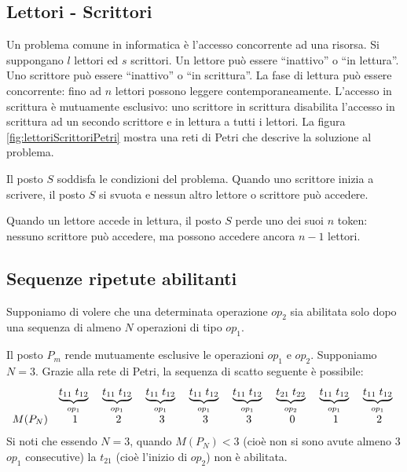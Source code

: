 \documentclass[a4paper]{report}
\begin{document}
\subsection{Lettori - Scrittori}
Un problema comune in informatica \`e l'accesso concorrente ad una
risorsa. Si suppongano $l$ lettori ed $s$ scrittori. Un lettore pu\`o
essere ``inattivo'' o ``in lettura''. Uno scrittore pu\`o essere
``inattivo'' o ``in scrittura''. La fase di lettura pu\`o essere
concorrente: fino ad $n$ lettori possono leggere
contemporaneamente. L'accesso in scrittura \`e mutuamente esclusivo:
uno scrittore in scrittura disabilita l'accesso in scrittura ad un
secondo scrittore e in lettura a tutti i lettori.
La figura \ref{fig:lettoriScrittoriPetri} mostra una reti di Petri che
descrive la soluzione al problema.

Il posto $S$ soddisfa le condizioni del problema. Quando uno scrittore
inizia a scrivere, il posto $S$ si svuota e nessun altro
lettore o scrittore pu\`o accedere.

Quando un lettore accede in lettura, il posto $S$ perde uno dei suoi
$n$ token: nessuno scrittore pu\`o accedere, ma possono accedere
ancora $n - 1$ lettori.

\subsection{Sequenze ripetute abilitanti}
Supponiamo di volere che una determinata operazione $op_2$ sia
abilitata solo dopo una sequenza di almeno $N$ operazioni di tipo
$op_1$.

Il posto $P_m$ rende mutuamente esclusive le operazioni $op_1$ e
$op_2$. Supponiamo $N = 3$. Grazie alla rete di Petri, la sequenza di
scatto seguente \`e possibile:
\[
\begin{array}{c c c c c c c c c}
  &
  \underbrace{t_{11} \; t_{12}}_\text{$op_1$}\; &
  \underbrace{t_{11} \; t_{12}}_\text{$op_1$}\; &
  \underbrace{t_{11} \; t_{12}}_\text{$op_1$}\; &
  \underbrace{t_{11} \; t_{12}}_\text{$op_1$}\; &
  \underbrace{t_{11} \; t_{12}}_\text{$op_1$}\; &
  \underbrace{t_{21} \; t_{22}}_\text{$op_2$}\; &
  \underbrace{t_{11} \; t_{12}}_\text{$op_1$}\; &
  \underbrace{t_{11} \; t_{12}}_\text{$op_1$}\; \\
  M(P_N) &
  1 &
  2 &
  3 &
  3 &
  3 &
  0 &
  1 &
  2
\end{array}
\]
Si noti che essendo $N = 3$, quando $M(P_N) < 3$ (cio\`e non si sono
avute almeno 3 $op_1$ consecutive) la $t_{21}$ (cio\`e l'inizio di
$op_2$) non \`e abilitata.
\end{document}
